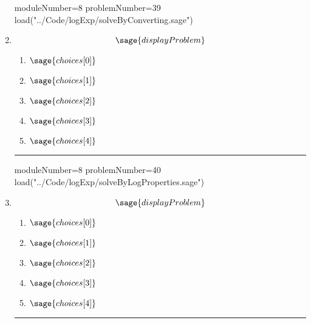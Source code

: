 \documentclass[14pt]{article}
\newcommand{\litem}[1]{\item#1\hspace*{-1cm}\rule{\textwidth}{0.4pt}}
\begin{document}
\begin{enumerate}
\begin{sagesilent}
moduleNumber=8
problemNumber=39
load("../Code/logExp/solveByConverting.sage")
\end{sagesilent}
\litem{ 
\[ \sage{displayProblem} \]
	\begin{enumerate}[label=\Alph*.]
  \item \( \sage{choices[0]} \)
  \item \( \sage{choices[1]} \)
  \item \( \sage{choices[2]} \)
  \item \( \sage{choices[3]} \)
  \item \( \sage{choices[4]} \)
	\end{enumerate}
}

\begin{sagesilent}
moduleNumber=8
problemNumber=40
load("../Code/logExp/solveByLogProperties.sage")
\end{sagesilent}

\litem{ 
	\[ \sage{displayProblem} \]
	\begin{enumerate}[label=\Alph*.]
  \item \( \sage{choices[0]} \)
  \item \( \sage{choices[1]} \)
  \item \( \sage{choices[2]} \)
  \item \( \sage{choices[3]} \)
  \item \( \sage{choices[4]} \)
	\end{enumerate}
}

\end{enumerate}
\end{document}
